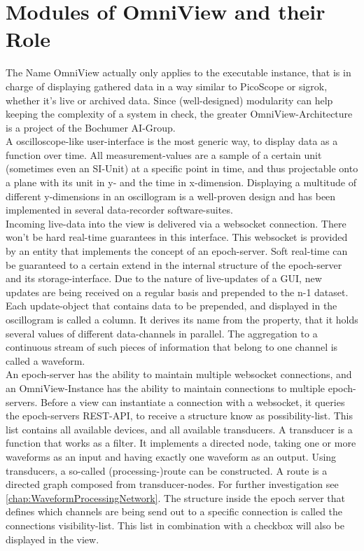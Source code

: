 \documentclass{scrreprt}
\begin{document}
\section[Modules]{Modules of OmniView and their Role}
The Name OmniView actually only applies to the executable instance, that is in charge of displaying gathered data in a way similar to PicoScope or sigrok, whether it's live or archived data. 
Since (well-designed) modularity can help keeping the complexity of a system in check, the greater OmniView-Architecture is a project of the Bochumer AI-Group.
\\
A oscilloscope-like user-interface is the most generic way, to display data as a function over time. 
All measurement-values are a sample of a certain unit (sometimes even an SI-Unit) at a specific point in time, and thus projectable onto a plane with its unit in y- and the time in x-dimension. 
Displaying a multitude of different y-dimensions in an oscillogram is a well-proven design and has been implemented in several data-recorder software-suites. 
\\
Incoming live-data into the view is delivered via a websocket connection.
There won't be hard real-time guarantees in this interface. 
This websocket is provided by an entity that implements the concept of an epoch-server.
Soft real-time can be guaranteed to a certain extend in the internal structure of the epoch-server and its storage-interface.
Due to the nature of live-updates of a GUI, new updates are being received on a regular basis and prepended to the n-1 dataset.
Each update-object that contains data to be prepended, and displayed in the oscillogram is called a column. 
It derives its name from the property, that it holds several values of different data-channels in parallel.
The aggregation to a continuous stream of such pieces of information that belong to one channel is called a waveform. 
\\
An epoch-server has the ability to maintain multiple websocket connections, and an OmniView-Instance has the ability to maintain connections to multiple epoch-servers. 
Before a view can instantiate a connection with a websocket, it queries the epoch-servers REST-API, to receive a structure know as possibility-list.
This list contains all available devices, and all available transducers. 
A transducer is a function that works as a filter.
It implements a directed node, taking one or more waveforms as an input and having exactly one waveform as an output. 
Using transducers, a so-called (processing-)route can be constructed. 
A route is a directed graph composed from transducer-nodes. 
For further investigation see \ref{chap:WaveformProcessingNetwork}.
The structure inside the epoch server that defines which channels are being send out to a specific connection is called the connections visibility-list. 
This list in combination with a checkbox will also be displayed in the view.
\end{document}
